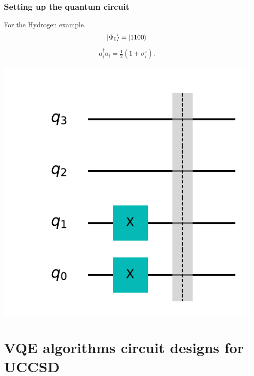 \documentclass{beamer}
\renewcommand{\(}{\left(}
\renewcommand{\)}{\right)}
\renewcommand{\[}{\left[}
\renewcommand{\]}{\right]}
\begin{document}
\begin{frame}
    \frametitle{Setting up the quantum circuit }
    For the Hydrogen example. 
    \begin{align*}
        \ket{\Phi_0} = \ket{1100}
    \end{align*}
    \begin{align*}
        a^\dagger_i a_i = \frac{1}{2} (1 + \sigma^z_i ). 
    \end{align*}
    
    \centering
    \includegraphics[scale=0.5]{initial_state.pdf}
\end{frame}




\section{VQE algorithms circuit designs for UCCSD}
\end{document}
